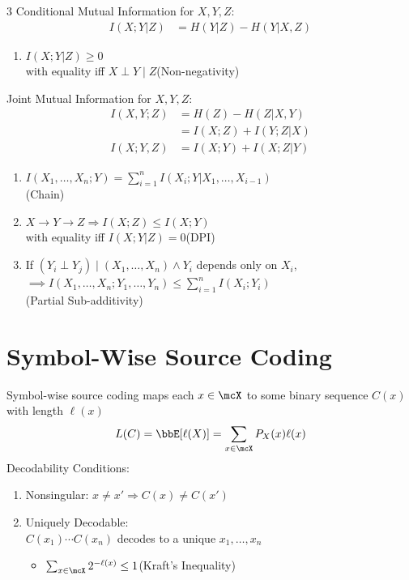 \documentclass[12pt, a4paper]{article}
\begin{document}
\begin{multicols*}{3}
Conditional Mutual Information for $X,Y,Z$:
\begin{align*}
  I(X;Y|Z) &= H(Y|Z) - H(Y|X,Z)
\end{align*}
\begin{enumerate}[\roman*.]
  \item $I(X;Y|Z)\ge 0$\\with equality iff $X\perp Y\mid Z$\hfill(Non-negativity)
\end{enumerate}

Joint Mutual Information for $X,Y,Z$:
\begin{align*}
  I(X,Y;Z) &= H(Z) - H(Z|X,Y)\\
           &= I(X;Z) + I(Y;Z|X)\\
  I(X;Y,Z) &= I(X;Y) + I(X;Z|Y)
\end{align*}
\begin{enumerate}[\roman*.]
  \item $I(X_1,\dots,X_n;Y)=\sum_{i=1}^n I(X_i;Y|X_1,\dots,X_{i-1})$\\\hfill(Chain)
  \item $X\to Y\to Z \Rightarrow I(X;Z)\le I(X;Y)$\\
        with equality iff $I(X;Y|Z)=0$\hfill(DPI)
  \item If $(Y_i \perp Y_j)\mid (X_1,\dots,X_n)\land Y_i$ depends only on $X_i$,\\
    $\implies I(X_1,\dots,X_n;Y_1,\dots,Y_n)\le \sum_{i=1}^n I(X_i;Y_i)$\\\hfill(Partial Sub-additivity)
\end{enumerate}
\colbreak
\section{Symbol-Wise Source Coding}
Symbol-wise source coding maps each $x \in \mcX$ to some binary sequence $C(x)$ with length $\ell(x)$
\begin{align*}
  L(C) =  \E[\ell(X)] = \sum_{x\in\mcX} P_X(x)\ell(x) 
\end{align*}
Decodability Conditions:
\begin{enumerate}[\roman*.]
  \item Nonsingular: $x\neq x' \Rightarrow C(x)\neq C(x')$
  \item Uniquely Decodable:\\$C(x_1)\cdots C(x_n)$ decodes to a unique $x_1,\dots,x_n$
    \begin{itemize}[leftmargin=*]\vspace{3pt}
      \item $\sum_{x\in\mcX} 2^{-\ell(x)} \leq 1$\hfill(Kraft's Inequality)
    \end{itemize}
\end{enumerate}


\end{multicols*}
\end{document}
